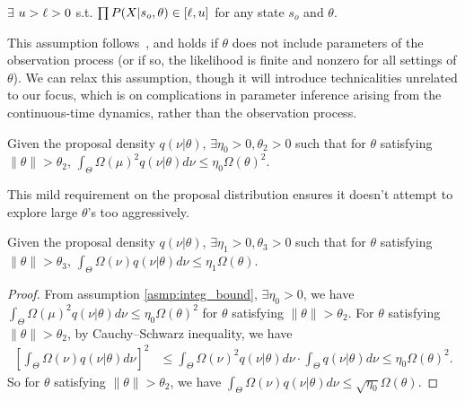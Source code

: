 \begin{assumption}
$\exists$ $ u > \ell > 0$ s.t.
$\prod P(X | s_o, \theta) \in [\ell, u]$ for any state $s_o$ and $\theta$.%
  \label{asmp:obs_bnd}
\end{assumption}
\noindent This assumption follows~\cite{miasojedow2017}, and holds if
$\theta$ does not include parameters of the observation process (or if so,
the likelihood is finite and nonzero for all settings of $\theta$). We can relax this assumption,
though it will introduce technicalities unrelated to our focus, which 
is on complications in parameter inference arising from the continuous-time
dynamics, rather than the observation process. 

\begin{assumption}
Given the proposal density $q(\nu | \theta)$, $\exists \eta_0 > 0, \theta_2 > 0$ 
such that for $\theta$ satisfying $\| \theta \|  > \theta_2$, 
$ \int_\Theta \Omega(\mu)^2 q(\nu | \theta)d\nu \leq \eta_0 \Omega(\theta)^2.$
\label{asmp:integ_bound}
\end{assumption}
\noindent This mild requirement on the proposal distribution ensures it 
doesn't attempt
to explore large $\theta$'s too aggressively.
\begin{corollary}
Given the proposal density $q(\nu | \theta)$, $\exists \eta_1 > 0, \theta_3 > 0$ such that for $\theta$ 
satisfying $\| \theta \|  > \theta_3$, 
$ \int_\Theta \Omega(\nu) q(\nu | \theta)d\nu \leq \eta_1 \Omega(\theta).$
\label{corol:integ_bound}
\end{corollary}
\begin{proof}
From assumption \ref{asmp:integ_bound},  $\exists \eta_0 > 0$, we have $ \int_\Theta \Omega(\mu)^2 q(\nu | \theta)d\nu \leq \eta_0 \Omega(\theta)^2$ for $\theta$ satisfying $\| \theta \|  > \theta_2$.
For $\theta$ satisfying $\| \theta \|  > \theta_2$, by Cauchy–Schwarz inequality, we have
\begin{align*}
\left[ \int_\Theta \Omega(\nu) q(\nu | \theta) d\nu \right]^2 &\le \int_\Theta \Omega(\nu)^2 q(\nu | \theta) d\nu \cdot \int_\Theta q(\nu | \theta) d\nu \le \eta_0 \Omega(\theta)^2.
\end{align*}
So for $\theta$ satisfying $\| \theta \|  > \theta_2$, we have $\int_\Theta \Omega(\nu) q(\nu | \theta) d\nu \le \sqrt{\eta_0} \Omega(\theta).$
\end{proof}

